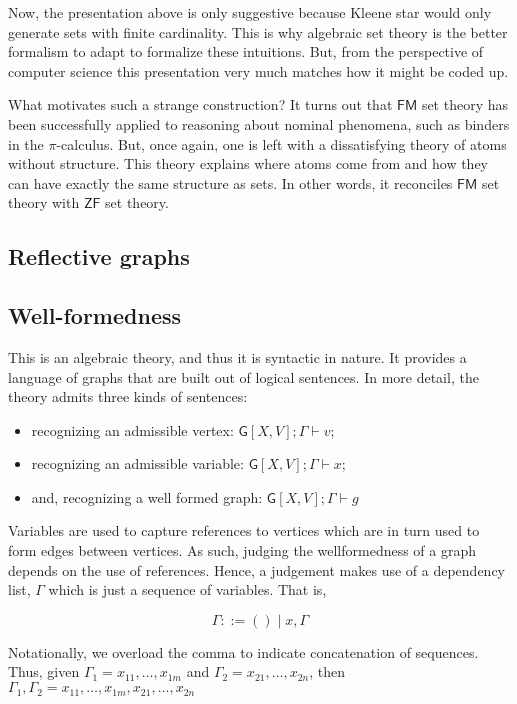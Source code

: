 Now, the presentation above is only suggestive because Kleene star
would only generate sets with finite cardinality. This is why
algebraic set theory is the better formalism to adapt to formalize
these intuitions. But, from the perspective of computer science this
presentation very much matches how it might be coded up.

What motivates such a strange construction? It turns out that
$\mathsf{FM}$ set theory has been successfully applied to reasoning
about nominal phenomena, such as binders in the $\pi$-calculus. But,
once again, one is left with a dissatisfying theory of atoms without
structure. This theory explains where atoms come from and how they can
have exactly the same structure as sets. In other words, it reconciles
$\mathsf{FM}$ set theory with $\mathsf{ZF}$ set theory.

\subsection{Reflective graphs}

\subsection{Well-formedness}

This is an algebraic theory, and thus it is syntactic in nature. It
provides a language of graphs that are built out of logical sentences.
In more detail, the theory admits three kinds of sentences:

\begin{itemize}
\item
  recognizing an admissible vertex:
  \(\mathsf{G}[X,V]; \Gamma \vdash v\);
\item
  recognizing an admissible variable:
  \(\mathsf{G}[X,V]; \Gamma \vdash x\);
\item
  and, recognizing a well formed graph:
  \(\mathsf{G}[X,V]; \Gamma \vdash g\)
\end{itemize}

Variables are used to capture references to vertices which are in turn
used to form edges between vertices. As such, judging the wellformedness
of a graph depends on the use of references. Hence, a judgement makes
use of a dependency list, \(\Gamma\) which is just a sequence of
variables. That is,

\[\Gamma ::= () \;|\; x, \Gamma\]

Notationally, we overload the comma to indicate concatenation of
sequences. Thus, given \(\Gamma_1 = x_{11},\ldots,x_{1m}\) and
\(\Gamma_2 = x_{21},\ldots,x_{2n}\), then
\(\Gamma_1,\Gamma_2 = x_{11},\ldots,x_{1m},x_{21},\ldots,x_{2n}\)

